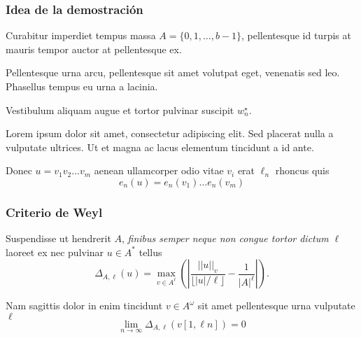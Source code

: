 \documentclass[t, 10pt, mathserif]{beamer}
\newcommand{\alocc}[2]{|\!|#1|\!|_{#2}}
\begin{document}

\begin{frame}
  \frametitle{Idea de la demostración}

  \medskip
  \begin{definition}
    Curabitur imperdiet tempus massa $A=\{0,1, \ldots, b-1\}$, pellentesque id turpis at mauris tempor auctor at pellentesque ex.
    \pause

    Pellentesque urna arcu, pellentesque sit amet volutpat eget, venenatis sed leo. Phasellus tempus eu urna a lacinia.
    \pause

    Vestibulum aliquam augue et tortor pulvinar suscipit $w^{\star}_n$.
    \pause

    Lorem ipsum dolor sit amet, consectetur adipiscing elit. Sed placerat nulla a vulputate ultrices. Ut et magna ac lacus elementum tincidunt a id ante.

    {\color{magenta}
      Donec $u=v_1 v_2 \ldots v_m$ aenean ullamcorper odio vitae $v_i$ erat $\ell_n$  rhoncus quis
      \[
      e_n(u)=e_n(v_1)\ldots e_n(v_m)
      \]
    }
  \end{definition}
\end{frame}


\begin{frame}
  \frametitle{Criterio de Weyl}

  \medskip
  \begin{definition}
    Suspendisse ut hendrerit $A$,  \textit{finibus semper neque non congue tortor dictum $\ell$} laoreet ex nec pulvinar $u\in A^*$ tellus
    \begin{equation*}
      \Delta_{A,\ell}(u) = 
      \max_{v \in A^{\ell}}\left(\left|\frac{\alocc{u}{v}}{\lfloor|u|/\ell \rfloor} - \frac{1}{|A|^{\ell}}\right|\right).
    \end{equation*}
  \end{definition}
  \pause

  Nam sagittis dolor in enim tincidunt $v\in A^\omega$ sit amet pellentesque urna vulputate $\ell$
  $$\lim_{n \rightarrow \infty} \Delta_{A, \ell}(v[1,\ell n]) = 0$$
\end{frame}


\end{document}
